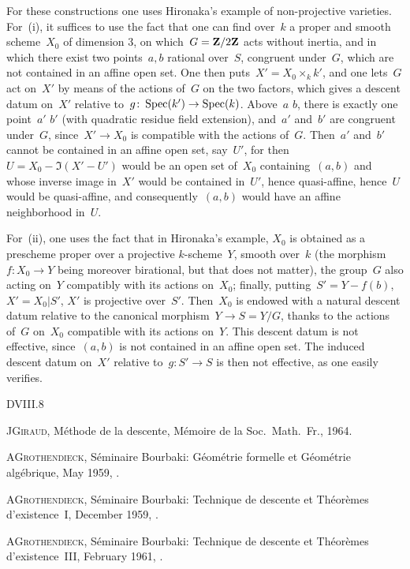 \begin{remarks}
For these constructions one uses Hironaka's example of
non-projective varieties. For~(i), it suffices to use the
fact that one can find over~$k$ a proper and
smooth scheme~$X_{0}$ of dimension 3, on which~$G=\mathbf{Z}/2\mathbf{Z}$ acts without
inertia, and in which there exist two points~$a,b$ rational
over~$S$,
congruent under~$G$, which are not contained in an affine open set. One
then puts~$X'=X_{0}\times_{k}k'$, and one lets~$G$ act on~$X'$
by means of the actions of~$G$ on the two factors, which
gives a descent datum on~$X'$ relative to~$g\colon
\Spec(k')\to \Spec(k)$. Above~$a$ \resp $b$, there is exactly
one point~$a'$ \resp $b'$ (with quadratic residue field
extension), and~$a'$ and~$b'$ are congruent under~$G$, since~$X'\to
X_{0}$ is compatible with the actions of~$G$. Then~$a'$
and~$b'$ cannot be contained in an affine open set, say~$U'$,
for then~$U=X_{0}-\Im(X'-U')$ would be an open set of~$X_{0}$
containing~$(a,b)$ and whose inverse image in~$X'$ would be contained
in~$U'$, hence quasi-affine, hence~$U$ would be quasi-affine, and
consequently~$(a,b)$ would have an affine neighborhood in~$U$.

For~(ii), one uses the fact that in Hironaka's example, $X_{0}$
is obtained as a prescheme proper over
a projective $k$-scheme~$Y$, smooth over~$k$ (the
morphism~$f\colon X_{0}\to Y$ being moreover birational, but
that does not matter), the group~$G$ also acting on~$Y$
compatibly with its actions on~$X_{0}$; finally,
putting~$S'=Y-f(b)$, $X'=X_{0}|S'$, $X'$ is projective
over~$S'$. Then~$X_{0}$ is endowed with a natural descent
datum relative to the canonical
morphism~$Y\to S=Y/G$, thanks to the actions of~$G$
on~$X_{0}$ compatible with its actions on~$Y$. This
descent datum is not effective, since~$(a,b)$ is not
contained in an affine open set. The induced descent datum
on~$X'$ relative to~$g\colon S'\to S$ is then not
effective, as one easily verifies.
\end{remarks}

\begin{thebibliography}{D}{VIII.8}

 J\ptbl \textsc{Giraud}, M\'ethode de la descente, M\'emoire 
de la Soc.\ Math.\ Fr., 1964.

 A\ptbl \textsc{Grothendieck}, S\'eminaire Bourbaki:
G\'eom\'etrie formelle et G\'eom\'etrie alg\'ebrique, May
1959, .

 A\ptbl \textsc{Grothendieck}, S\'eminaire Bourbaki: Technique de
descente et Th\'eor\`emes d'existence~I, December 1959,
.

 A\ptbl \textsc{Grothendieck}, S\'eminaire Bourbaki: Technique de
descente et Th\'eor\`emes d'existence~III, February 1961,
.
\end{thebibliography}
